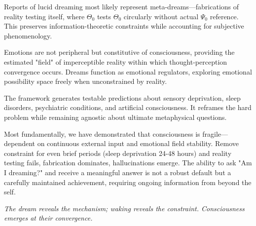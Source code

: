 \documentclass[11pt,a4paper]{article}
\begin{document}
Reports of lucid dreaming most likely represent meta-dreams—fabrications of reality testing itself, where $\Theta_0$ tests $\Theta_0$ circularly without actual $\Psi_0$ reference. This preserves information-theoretic constraints while accounting for subjective phenomenology.

Emotions are not peripheral but constitutive of consciousness, providing the estimated "field" of imperceptible reality within which thought-perception convergence occurs. Dreams function as emotional regulators, exploring emotional possibility space freely when unconstrained by reality.

The framework generates testable predictions about sensory deprivation, sleep disorders, psychiatric conditions, and artificial consciousness. It reframes the hard problem while remaining agnostic about ultimate metaphysical questions.

Most fundamentally, we have demonstrated that consciousness is fragile—dependent on continuous external input and emotional field stability. Remove constraint for even brief periods (sleep deprivation 24-48 hours) and reality testing fails, fabrication dominates, hallucinations emerge. The ability to ask "Am I dreaming?" and receive a meaningful answer is not a robust default but a carefully maintained achievement, requiring ongoing information from beyond the self.

\vspace{1em}

\noindent\textit{The dream reveals the mechanism; waking reveals the constraint. Consciousness emerges at their convergence.}



\end{document}
